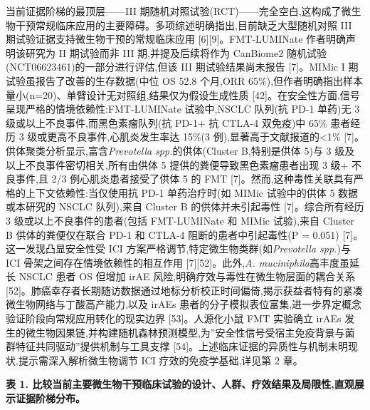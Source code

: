 \documentclass[11pt]{article}
\begin{document}
当前证据阶梯的最顶层------III 期随机对照试验(RCT)------完全空白,这构成了微生物干预常规临床应用的主要障碍。多项综述明确指出,目前缺乏大型随机对照 III 期试验证据支持微生物干预的常规临床应用 {[}6{]}{[}9{]}。FMT-LUMINate 作者明确声明该研究为 II 期试验而非 III 期,并提及后续将作为 CanBiome2 随机试验(NCT06623461)的一部分进行评估,但该 III 期试验结果尚未报告 {[}7{]}。MIMic I 期试验虽报告了改善的生存数据(中位 OS 52.8 个月,ORR 65\%),但作者明确指出样本量小(n=20)、单臂设计无对照组,结果仅为假设生成性质 {[}42{]}。在安全性方面,信号呈现严格的情境依赖性:FMT-LUMINate 试验中,NSCLC 队列(抗 PD-1 单药)无 3 级或以上不良事件,而黑色素瘤队列(抗 PD-1+ 抗 CTLA-4 双免疫)中 65\% 患者经历 3 级或更高不良事件,心肌炎发生率达 15\%(3 例),显著高于文献报道的\textless1\% {[}7{]}。供体聚类分析显示,富含\emph{Prevotella spp.}的供体(Cluster B,特别是供体 5)与 3 级及以上不良事件密切相关,所有由供体 5 提供的粪便导致黑色素瘤患者出现 3 级+ 不良事件,且 2/3 例心肌炎患者接受了供体 5 的 FMT {[}7{]}。然而,这种毒性关联具有严格的上下文依赖性:当仅使用抗 PD-1 单药治疗时(如 MIMic 试验中的供体 5 数据或本研究的 NSCLC 队列),来自 Cluster B 的供体并未引起毒性 {[}7{]}。综合所有经历 3 级或以上不良事件的患者(包括 FMT-LUMINate 和 MIMic 试验),来自 Cluster B 供体的粪便仅在联合 PD-1 和 CTLA-4 阻断的患者中引起毒性(P = 0.051) {[}7{]}。这一发现凸显安全性受 ICI 方案严格调节,特定微生物类群(如\emph{Prevotella spp.})与 ICI 骨架之间存在情境依赖性的相互作用 {[}7{]}{[}52{]}。此外,\emph{A. muciniphila}高丰度虽延长 NSCLC 患者 OS 但增加 irAE 风险,明确疗效与毒性在微生物层面的耦合关系 {[}52{]}。肺癌幸存者长期随访数据通过地标分析校正时间偏倚,揭示获益者特有的紧凑微生物网络与丁酸高产能力,以及 irAEs 患者的分子模拟表位富集,进一步界定概念验证阶段向常规应用转化的现实边界 {[}53{]}。人源化小鼠 FMT 实验确立 irAEs 发生的微生物因果链,并构建随机森林预测模型,为''安全性信号受宿主免疫背景与菌群特征共同驱动''提供机制与工具支撑 {[}54{]}。上述临床证据的异质性与机制未明现状,提示需深入解析微生物调节 ICI 疗效的免疫学基础,详见第 2 章。

\textbf{表 1. 比较当前主要微生物干预临床试验的设计、人群、疗效结果及局限性,直观展示证据阶梯分布。}
\end{document}
